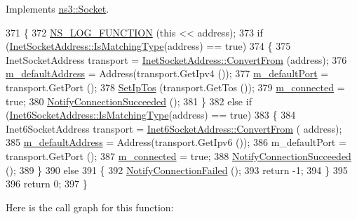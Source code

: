 Implements \hyperlink{classns3_1_1Socket_a97f08aaf37b8fd7d4b5cad4dfdd4022a}{ns3\+::\+Socket}.


\begin{DoxyCode}
371 \{
372   \hyperlink{log-macros-disabled_8h_a90b90d5bad1f39cb1b64923ea94c0761}{NS\_LOG\_FUNCTION} (\textcolor{keyword}{this} << address);
373   \textcolor{keywordflow}{if} (\hyperlink{classns3_1_1InetSocketAddress_a9426766e34e928ce5dbdbeb9563a10df}{InetSocketAddress::IsMatchingType}(address) == \textcolor{keyword}{true})
374     \{
375       InetSocketAddress transport = \hyperlink{classns3_1_1InetSocketAddress_ade776b1109e7b9a7be0b22ced49931e3}{InetSocketAddress::ConvertFrom} (address);
376       \hyperlink{classns3_1_1UdpSocketImpl_a820bb30415d2627cea60338649d19ccb}{m\_defaultAddress} = Address(transport.GetIpv4 ());
377       \hyperlink{classns3_1_1UdpSocketImpl_a990120b2cc768c47a6a2a2a1e53875c8}{m\_defaultPort} = transport.GetPort ();
378       \hyperlink{classns3_1_1Socket_a2a21a2d166ec2adf766b84d984d1cf65}{SetIpTos} (transport.GetTos ());
379       \hyperlink{classns3_1_1UdpSocketImpl_a2df1a2df7ba0f4c852ad1d2155b1fbcc}{m\_connected} = \textcolor{keyword}{true};
380       \hyperlink{classns3_1_1Socket_a2f55d195304131b356818bc74134c5a7}{NotifyConnectionSucceeded} ();
381     \}
382   \textcolor{keywordflow}{else} \textcolor{keywordflow}{if} (\hyperlink{classns3_1_1Inet6SocketAddress_a4d928c54affbfb530a12076d6d7e0540}{Inet6SocketAddress::IsMatchingType}(address) == \textcolor{keyword}{true})
383     \{
384       Inet6SocketAddress transport = \hyperlink{classns3_1_1Inet6SocketAddress_a2177c66e1bcf17c85dcffb9d2a971f5a}{Inet6SocketAddress::ConvertFrom} (
      address);
385       \hyperlink{classns3_1_1UdpSocketImpl_a820bb30415d2627cea60338649d19ccb}{m\_defaultAddress} = Address(transport.GetIpv6 ());
386       m\_defaultPort = transport.GetPort ();
387       \hyperlink{classns3_1_1UdpSocketImpl_a2df1a2df7ba0f4c852ad1d2155b1fbcc}{m\_connected} = \textcolor{keyword}{true};
388       \hyperlink{classns3_1_1Socket_a2f55d195304131b356818bc74134c5a7}{NotifyConnectionSucceeded} ();
389     \}
390   \textcolor{keywordflow}{else}
391     \{
392       \hyperlink{classns3_1_1Socket_a34f83cdc8fb487ac8ea5436d184827c4}{NotifyConnectionFailed} ();
393       \textcolor{keywordflow}{return} -1;
394     \}
395 
396   \textcolor{keywordflow}{return} 0;
397 \}
\end{DoxyCode}


Here is the call graph for this function\+:


